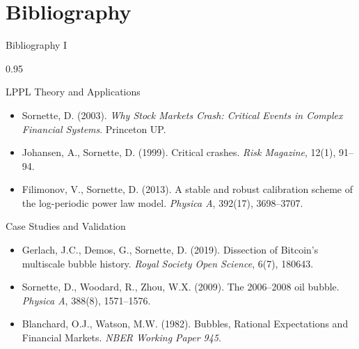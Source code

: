 \documentclass[9pt, aspectratio=169, t]{beamer}
\begin{document}
\section{Bibliography}

\begin{frame}{Bibliography I}
    \begin{cminipage}{0.95\textwidth}
    \begin{block}{LPPL Theory and Applications}
        {\small
        \begin{itemize}\setlength{\itemsep}{0pt}
            \item Sornette, D. (2003). \textit{Why Stock Markets Crash: Critical Events in Complex Financial Systems}. Princeton UP.
            \item Johansen, A., Sornette, D. (1999). Critical crashes. \textit{Risk Magazine}, 12(1), 91--94.
            \item Filimonov, V., Sornette, D. (2013). A stable and robust calibration scheme of the log-periodic power law model. \textit{Physica A}, 392(17), 3698--3707.
        \end{itemize}
        }
    \end{block}

    \begin{exampleblock}{Case Studies and Validation}
        {\small
        \begin{itemize}\setlength{\itemsep}{0pt}
            \item Gerlach, J.C., Demos, G., Sornette, D. (2019). Dissection of Bitcoin's multiscale bubble history. \textit{Royal Society Open Science}, 6(7), 180643.
            \item Sornette, D., Woodard, R., Zhou, W.X. (2009). The 2006--2008 oil bubble. \textit{Physica A}, 388(8), 1571--1576.
            \item Blanchard, O.J., Watson, M.W. (1982). Bubbles, Rational Expectations and Financial Markets. \textit{NBER Working Paper 945}.
        \end{itemize}
        }
    \end{exampleblock}
    \end{cminipage}
\end{frame}
\end{document}
